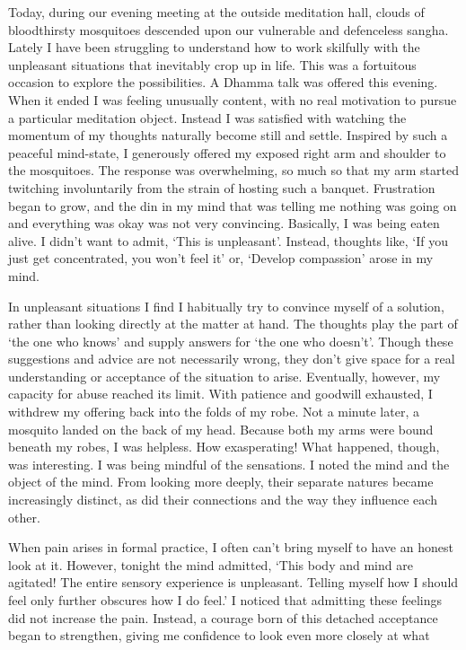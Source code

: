 Today, during our evening meeting at the outside meditation hall, clouds
of bloodthirsty mosquitoes descended upon our vulnerable and defenceless
sangha. Lately I have been struggling to understand how to work
skilfully with the unpleasant situations that inevitably crop up in
life. This was a fortuitous occasion to explore the possibilities. A
Dhamma talk was offered this evening. When it ended I was feeling
unusually content, with no real motivation to pursue a particular
meditation object. Instead I was satisfied with watching the momentum of
my thoughts naturally become still and settle. Inspired by such a
peaceful mind-state, I generously offered my exposed right arm and
shoulder to the mosquitoes. The response was overwhelming, so much so
that my arm started twitching involuntarily from the strain of hosting
such a banquet. Frustration began to grow, and the din in my mind that
was telling me nothing was going on and everything was okay was not very
convincing. Basically, I was being eaten alive. I didn't want to admit,
`This is unpleasant'. Instead, thoughts like, `If you just get
concentrated, you won't feel it' or, `Develop compassion' arose in my
mind.

In unpleasant situations I find I habitually try to convince myself of a
solution, rather than looking directly at the matter at hand. The
thoughts play the part of `the one who knows' and supply answers for
`the one who doesn't'. Though these suggestions and advice are not
necessarily wrong, they don't give space for a real understanding or
acceptance of the situation to arise. Eventually, however, my capacity
for abuse reached its limit. With patience and goodwill exhausted, I
withdrew my offering back into the folds of my robe. Not a minute later,
a mosquito landed on the back of my head. Because both my arms were
bound beneath my robes, I was helpless. How exasperating! What happened,
though, was interesting. I was being mindful of the sensations. I noted
the mind and the object of the mind. From looking more deeply, their
separate natures became increasingly distinct, as did their connections
and the way they influence each other.

When pain arises in formal practice, I often can't bring myself to have
an honest look at it. However, tonight the mind admitted, `This body and
mind are agitated! The entire sensory experience is unpleasant. Telling
myself how I should feel only further obscures how I do feel.' I noticed
that admitting these feelings did not increase the pain. Instead, a
courage born of this detached acceptance began to strengthen, giving me
confidence to look even more closely at what

